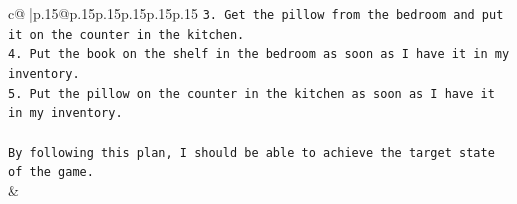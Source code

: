 \documentclass{article}
\begin{document}
{\begin{supertabular}{c@{$\;$}|p{.15\linewidth}@{}p{.15\linewidth}p{.15\linewidth}p{.15\linewidth}p{.15\linewidth}p{.15\linewidth}}
{{{\texttt{3. Get the pillow from the bedroom and put it on the counter in the kitchen.} \\
\texttt{4. Put the book on the shelf in the bedroom as soon as I have it in my inventory.} \\
\texttt{5. Put the pillow on the counter in the kitchen as soon as I have it in my inventory.} \\
\\ 
\texttt{By following this plan, I should be able to achieve the target state of the game.} \\
            }
        }
    }
    & \\ \\

\end{supertabular}
}
\end{document}
